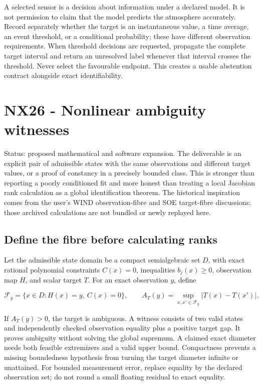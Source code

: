 \documentclass[
  11pt,
  a4paper,
]{report}
\begin{document}
A selected sensor is a decision about information under a declared
model. It is not permission to claim that the model predicts the
atmosphere accurately. Record separately whether the target is an
instantaneous value, a time average, an event threshold, or a
conditional probability; these have different observation requirements.
When threshold decisions are requested, propagate the complete target
interval and return an unresolved label whenever that interval crosses
the threshold. Never select the favourable endpoint. This creates a
usable abstention contract alongside exact identifiability.

\hypertarget{nx26---nonlinear-ambiguity-witnesses}{%
\chapter{NX26 - Nonlinear ambiguity
witnesses}\label{nx26---nonlinear-ambiguity-witnesses}}

Status: proposed mathematical and software expansion. The deliverable is
an explicit pair of admissible states with the same observations and
different target values, or a proof of constancy in a precisely bounded
class. This is stronger than reporting a poorly conditioned fit and more
honest than treating a local Jacobian rank calculation as a global
identification theorem. The historical inspiration comes from the user's
WIND observation-fibre and SOE target-fibre discussions; those archived
calculations are not bundled or newly replayed here.

\hypertarget{define-the-fibre-before-calculating-ranks}{%
\section{Define the fibre before calculating
ranks}\label{define-the-fibre-before-calculating-ranks}}

Let the admissible state domain be a compact semialgebraic set \(D\),
with exact rational polynomial constraints \(C(x)=0\), inequalities
\(b_j(x)\ge0\), observation map \(H\), and scalar target \(T\). For an
exact observation \(y\), define

\[
 \mathcal F_y=\{x\in D:H(x)=y,\ C(x)=0\},\qquad
 A_T(y)=\sup_{x,x'\in\mathcal F_y}|T(x)-T(x')|.
\]

If \(A_T(y)>0\), the target is ambiguous. A witness consists of two
valid states and independently checked observation equality plus a
positive target gap. It proves ambiguity without solving the global
supremum. A claimed exact diameter needs both feasible extremizers and a
valid upper bound. Compactness prevents a missing boundedness hypothesis
from turning the target diameter infinite or unattained. For bounded
measurement error, replace equality by the declared observation set; do
not round a small floating residual to exact equality.
\end{document}
